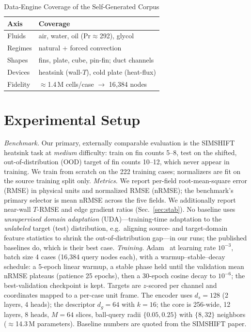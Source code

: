 \documentclass[conference]{IEEEtran}
\begin{document}
\begin{table}[t]\renewcommand{\arraystretch}{1.15}
\caption{Data-Engine Coverage of the Self-Generated Corpus}
\label{tab:corpus}\centering
\begin{tabular}{@{}ll@{}}\toprule
Axis & Coverage \\ \midrule
Fluids & air, water, oil (Pr$\approx$292), glycol \\
Regimes & natural + forced convection \\
Shapes & fins, plate, cube, pin-fin; duct channels \\
Devices & heatsink (wall-$T$), cold plate (heat-flux) \\
Fidelity & $\approx$1.4\,M cells/case $\rightarrow$ 16{,}384 nodes \\ \bottomrule
\end{tabular}
\end{table}

\section{Experimental Setup}
\textit{Benchmark.} Our primary, externally comparable evaluation is the SIMSHIFT~\cite{simshift}
heatsink task at \emph{medium} difficulty: train on fin counts 5--8, test on the shifted, out-of-distribution (OOD) target of fin
counts 10--12, which never appear in training. We train from scratch on the 222 training cases;
normalizers are fit on the source training split only. \textit{Metrics.} We report per-field root-mean-square error (RMSE) in
physical units and normalized RMSE (nRMSE); the benchmark's primary selector is mean nRMSE across the
five fields. We additionally report near-wall $T$-RMSE and edge gradient ratios (Sec.~\ref{sec:stab}).
No baseline uses \emph{unsupervised domain adaptation} (UDA)---training-time adaptation to the
\emph{unlabeled} target (test) distribution, e.g.\ aligning source- and target-domain feature
statistics to shrink the out-of-distribution gap---in our runs; the published baselines do, which
is their best case. \textit{Training.} Adam~\cite{adam} at learning rate $10^{-3}$, batch size 4 cases
(16{,}384 query nodes each), with a warmup--stable--decay schedule: a 5-epoch linear warmup, a stable
phase held until the validation mean nRMSE plateaus (patience 25 epochs), then a 30-epoch cosine decay
to $10^{-6}$; the best-validation checkpoint is kept. Targets are $z$-scored per channel and coordinates
mapped to a per-case unit frame. The encoder uses $d_s{=}128$ (2 layers, 4 heads); the descriptor
$d_g{=}64$ with $k{=}16$; the core is 256-wide, 12 layers, 8 heads, $M{=}64$ slices, ball-query radii
$\{0.05,0.25\}$ with $\{8,32\}$ neighbors ($\approx$14.3\,M parameters). Baseline numbers are quoted from
the SIMSHIFT paper.
\end{document}
